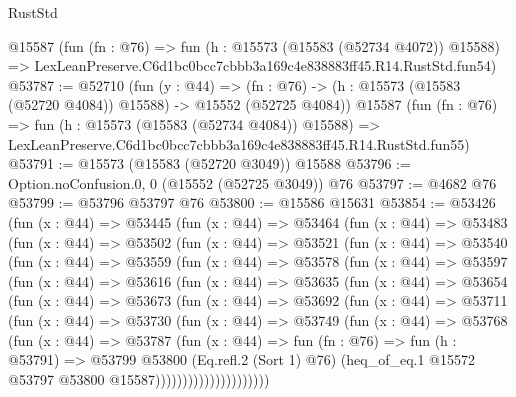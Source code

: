\begin{lexlean}{RustStd}
\begin{coremodule}
    @15587
    (fun (fn : @76) =>
    fun (h : @15573 (@15583 (@52734 @4072)) @15588) =>
    LexLeanPreserve.C6d1bc0bcc7cbbb3a169c4e838883ff45.R14.RustStd.fun54)
@53787 := @52710
    (fun (y : @44) =>
    (fn : @76) -> (h : @15573 (@15583 (@52720 @4084)) @15588) -> @15552 (@52725 @4084))
    @15587
    (fun (fn : @76) =>
    fun (h : @15573 (@15583 (@52734 @4084)) @15588) =>
    LexLeanPreserve.C6d1bc0bcc7cbbb3a169c4e838883ff45.R14.RustStd.fun55)
@53791 := @15573 (@15583 (@52720 @3049)) @15588
@53796 := Option.noConfusion.{0, 0} (@15552 (@52725 @3049)) @76
@53797 := @4682 @76
@53799 := @53796 @53797 @76
@53800 := @15586 @15631
@53854 := @53426
    (fun (x : @44) =>
    @53445
      (fun (x : @44) =>
      @53464
        (fun (x : @44) =>
        @53483
          (fun (x : @44) =>
          @53502
            (fun (x : @44) =>
            @53521
              (fun (x : @44) =>
              @53540
                (fun (x : @44) =>
                @53559
                  (fun (x : @44) =>
                  @53578
                    (fun (x : @44) =>
                    @53597
                      (fun (x : @44) =>
                      @53616
                        (fun (x : @44) =>
                        @53635
                          (fun (x : @44) =>
                          @53654
                            (fun (x : @44) =>
                            @53673
                              (fun (x : @44) =>
                              @53692
                                (fun (x : @44) =>
                                @53711
                                  (fun (x : @44) =>
                                  @53730
                                    (fun (x : @44) =>
                                    @53749
                                      (fun (x : @44) =>
                                      @53768
                                        (fun (x : @44) =>
                                        @53787
                                          (fun (x : @44) =>
                                          fun (fn : @76) =>
                                          fun (h : @53791) =>
                                          @53799
                                            @53800
                                            (Eq.refl.{2} (Sort 1) @76)
                                            (heq_of_eq.{1}
                                              @15572
                                              @53797
                                              @53800
                                              @15587)))))))))))))))))))))

\end{coremodule}
\end{lexlean}
